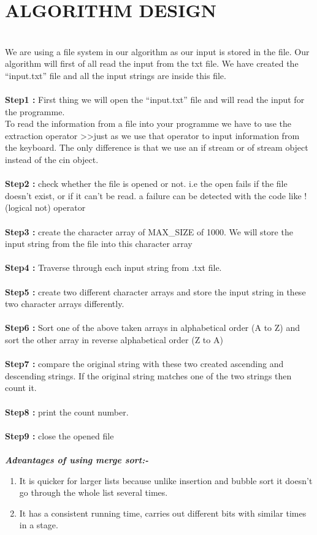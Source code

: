 \documentclass[conference]{IEEEtran}
\begin{document}
\section{ALGORITHM DESIGN}\\
We are using a file system in our algorithm as 
our input is stored in the file. Our algorithm 
will first of all read the input from the txt file. We have created the “input.txt” file and all the input strings are inside this file.\\
\\\textbf{Step1 :}
First thing we will open the “input.txt” file and will read the input for the programme. 
\\To read the information from a file into your 
programme we have to use the extraction 
operator \textgreater\textgreater  just as we use that operator to 
input information from the keyboard. The only 
difference is that we use an if stream or of stream object instead of the cin object. 
\\\\\textbf{Step2 :}
check whether the file is opened or 
not. i.e the open fails if the file doesn't exist, or if it can't be read. a failure can be detected with the code like !(logical not) operator 
\\\\\textbf{Step3 :}
create the character array of MAX\_SIZE of 1000. We will store the input string from the file into this character array
\\\\\textbf{Step4 :}
Traverse through each input string 
from .txt file.
\\\\\textbf{Step5 :}
create two different character arrays 
and store the input string in these two character 
arrays differently. 
\\\\\textbf{Step6 :}
Sort one of the above taken arrays in 
alphabetical order (A to Z) and sort the other 
array in reverse alphabetical order (Z to A)
\\\\\textbf{Step7 :}
compare the original string with these 
two created ascending and descending strings. 
If the original string matches one of the two 
strings then count it. 
\\\\\textbf{Step8 :}
print the count number.
\\\\\textbf{Step9 :}
close the opened file 
\\\\\textbf{\textit{Advantages of using merge sort:- }}
\begin{enumerate}
    \item  It is quicker for larger lists because unlike 
insertion and bubble sort it doesn't go through the 
whole list several times. 
    \item It has a consistent running time, carries out 
different bits with similar  times in a stage. 
\end{enumerate}
\end{document}

